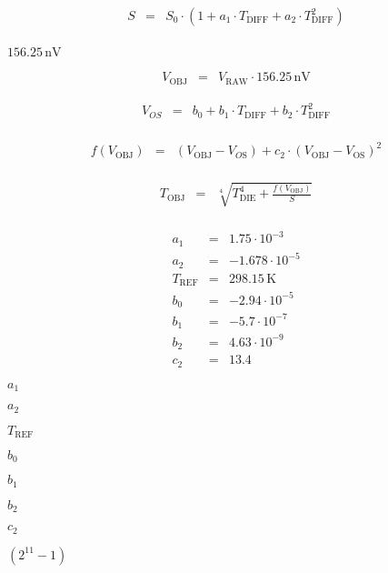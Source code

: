 \documentclass{article}
\begin{document}
\begin{eqnarray*} S &=& S_{\mathrm{0}} \cdot ( 1 + a_1 \cdot T_{\mathrm{DIFF}} + a_2 \cdot T_{\mathrm{DIFF}}^2 ) \\ \end{eqnarray*}
\pagebreak

$ 156.25\,\mathrm{nV} $
\pagebreak

\begin{eqnarray*} V_{\mathrm{OBJ}} &=& V_{\mathrm{RAW}} \cdot 156.25\,\mathrm{nV} \end{eqnarray*}
\pagebreak

\begin{eqnarray*} V_{OS} &=& b_0 + b_1 \cdot T_{\mathrm{DIFF}} + b_2 \cdot T_{\mathrm{DIFF}}^2 \\ \end{eqnarray*}
\pagebreak

\begin{eqnarray*} f(V_{\mathrm{OBJ}}) &=& (V_{\mathrm{OBJ}} - V_{O\mathrm{S}}) + c_2 \cdot (V_{\mathrm{OBJ}} - V_{\mathrm{OS}})^2 \\ \end{eqnarray*}
\pagebreak

\begin{eqnarray*} T_{\mathrm{OBJ}} &=& \sqrt[4]{T_{\mathrm{DIE}}^4 + \frac{f(V_{\mathrm{OBJ}})}{S}} \\ \end{eqnarray*}
\pagebreak

\begin{eqnarray*} a_{\mathrm{1}} &=& 1.75 \cdot 10^{-3} \\ a_{\mathrm{2}} &=& -1.678 \cdot 10^{-5} \\ T_{\mathrm{REF}} &=& 298.15\,\mathrm{K} \\ b_{\mathrm{0}} &=& -2.94 \cdot 10^{-5} \\ b_{\mathrm{1}} &=& -5.7 \cdot 10^{-7} \\ b_{\mathrm{2}} &=& 4.63 \cdot 10^{-9} \\ c_{\mathrm{2}} &=& 13.4 \end{eqnarray*}
\pagebreak

$a_{\mathrm{1}}$
\pagebreak

$a_{\mathrm{2}}$
\pagebreak

$T_{\mathrm{REF}}$
\pagebreak

$b_{\mathrm{0}}$
\pagebreak

$b_{\mathrm{1}}$
\pagebreak

$b_{\mathrm{2}}$
\pagebreak

$c_{\mathrm{2}}$
\pagebreak

$ (2^{11} - 1) $
\pagebreak
\end{document}
